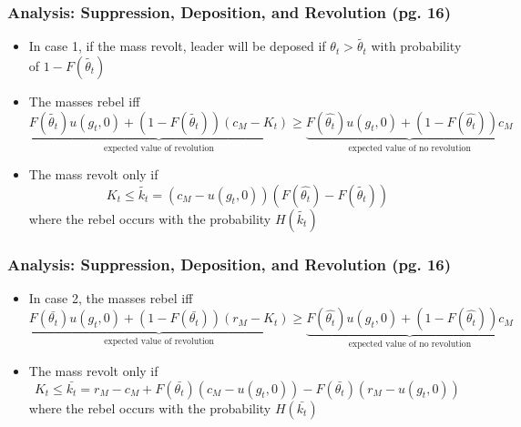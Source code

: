 \documentclass[10pt,handout]{beamer}
\begin{document}
\begin{frame}
\frametitle{Analysis: Suppression, Deposition, and Revolution (pg. 16)}
\begin{itemize}
    \item In case 1, if the mass revolt, leader will be deposed if $\theta_t > \tilde{\theta_t}$ with probability of $1 - F(\tilde{\theta_t})$
    \item The masses rebel iff
    \[
        \underbrace{F(\tilde{\theta_t})u(g_t, 0) + (1-F(\tilde{\theta_t}))(c_M-K_t)}_{\text{expected value of revolution}} \geq \underbrace{F(\hat{\theta_t})u(g_t, 0) + (1-F(\hat{\theta_t}))c_M}_\text{{expected value of no revolution}}
    \]
    \item The mass revolt only if
    \[
        K_t \leq \tilde{k_t} = (c_M - u(g_t, 0))(F(\hat{\theta_t}) - F(\tilde{\theta_t}))
    \]
    where the rebel occurs with the probability $H(\tilde{k_t})$
\end{itemize}
\end{frame}

\begin{frame}
\frametitle{Analysis: Suppression, Deposition, and Revolution (pg. 16)}
\begin{itemize}
    \item In case 2, the masses rebel iff
    \[
        \underbrace{F(\bar{\theta_t})u(g_t, 0) + (1-F(\bar{\theta_t}))(r_M-K_t)}_{\text{expected value of revolution}} \geq \underbrace{F(\hat{\theta_t})u(g_t, 0) + (1-F(\hat{\theta_t}))c_M}_\text{{expected value of no revolution}}
    \]
    \item The mass revolt only if
    \[
        K_t \leq \bar{k_t} = r_M - c_M + F(\bar{\theta_t})(c_M - u(g_t, 0)) - F(\bar{\theta_t})(r_M - u(g_t, 0))
    \]
    where the rebel occurs with the probability $H(\bar{k_t})$
\end{itemize}
\end{frame}
\end{document}
